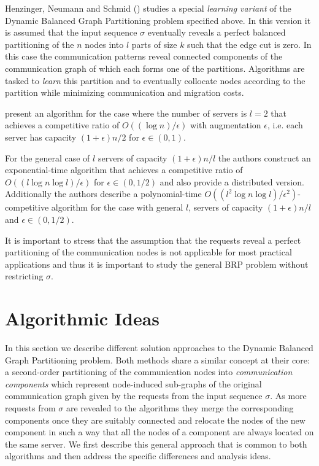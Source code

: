 \documentclass[a4paper,xcolor=dvipsnames, tikz, 12pt]{article}
\theoremstyle{definition}
\begin{document}
	Henzinger, Neumann and Schmid (\cite{Henzinger2019}) studies a special \textit{learning variant} of the Dynamic Balanced Graph Partitioning problem specified above. In this version it is assumed that the input sequence $\sigma$ eventually reveals a perfect balanced partitioning of the $n$ nodes into $l$ parts of size $k$ such that the edge cut is zero. In this case the communication patterns reveal connected components of the communication graph of which each forms one of the partitions. Algorithms are tasked to \textit{learn} this partition and to eventually collocate nodes according to the partition while minimizing communication and migration costs.
	
	\cite{Henzinger2019} present an algorithm for the case where the number of servers is $l=2$ that achieves a competitive ratio of $O((\log n)/\epsilon)$ with augmentation $\epsilon$, i.e. each server has capacity $(1+\epsilon)n/2$ for $\epsilon\in(0,1)$.
	
	For the general case of $l$ servers of capacity $(1+\epsilon)n/l$ the authors construct an exponential-time algorithm that achieves a competitive ratio of $O((l\log n \log l)/\epsilon)$ for $\epsilon\in(0,1/2)$ and also provide a distributed version.
	Additionally the authors describe a polynomial-time $O((l^2\log n\log l)/\epsilon^2)$-competitive algorithm for the case with general $l$, servers of capacity $(1+\epsilon)n/l$ and $\epsilon\in(0,1/2)$.
	
	It is important to stress that the assumption that the requests reveal a perfect partitioning of the communication nodes is not applicable for most practical applications and thus it is important to study the general BRP problem without restricting $\sigma$.
	
	\section{Algorithmic Ideas}
	In this section we describe different solution approaches to the Dynamic Balanced Graph Partitioning problem. Both methods share a similar concept at their core: a second-order partitioning of the communication nodes into \textit{communication components} which represent node-induced sub-graphs of the original communication graph given by the requests from the input sequence $\sigma$. As more requests from $\sigma$ are revealed to the algorithms they merge the corresponding components once they are suitably connected and relocate the nodes of the new component in such a way that all the nodes of a component are always located on the same server.
	We first describe this general approach that is common to both algorithms and then address the specific differences and analysis ideas.
	
\end{document}

